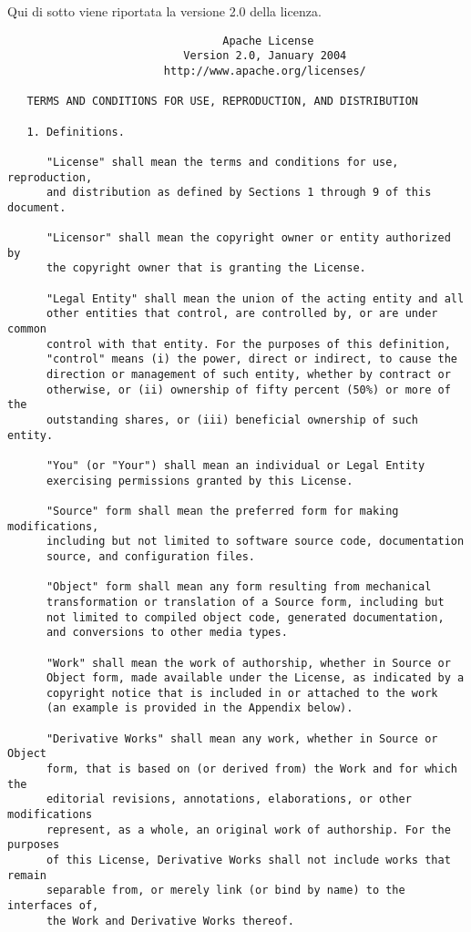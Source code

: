 Qui di sotto viene riportata la versione 2.0 della licenza.

\begin{verbatim}
                                 Apache License
                           Version 2.0, January 2004
                        http://www.apache.org/licenses/

   TERMS AND CONDITIONS FOR USE, REPRODUCTION, AND DISTRIBUTION

   1. Definitions.

      "License" shall mean the terms and conditions for use, reproduction,
      and distribution as defined by Sections 1 through 9 of this document.

      "Licensor" shall mean the copyright owner or entity authorized by
      the copyright owner that is granting the License.

      "Legal Entity" shall mean the union of the acting entity and all
      other entities that control, are controlled by, or are under common
      control with that entity. For the purposes of this definition,
      "control" means (i) the power, direct or indirect, to cause the
      direction or management of such entity, whether by contract or
      otherwise, or (ii) ownership of fifty percent (50%) or more of the
      outstanding shares, or (iii) beneficial ownership of such entity.

      "You" (or "Your") shall mean an individual or Legal Entity
      exercising permissions granted by this License.

      "Source" form shall mean the preferred form for making modifications,
      including but not limited to software source code, documentation
      source, and configuration files.

      "Object" form shall mean any form resulting from mechanical
      transformation or translation of a Source form, including but
      not limited to compiled object code, generated documentation,
      and conversions to other media types.

      "Work" shall mean the work of authorship, whether in Source or
      Object form, made available under the License, as indicated by a
      copyright notice that is included in or attached to the work
      (an example is provided in the Appendix below).

      "Derivative Works" shall mean any work, whether in Source or Object
      form, that is based on (or derived from) the Work and for which the
      editorial revisions, annotations, elaborations, or other modifications
      represent, as a whole, an original work of authorship. For the purposes
      of this License, Derivative Works shall not include works that remain
      separable from, or merely link (or bind by name) to the interfaces of,
      the Work and Derivative Works thereof.


\end{verbatim}
